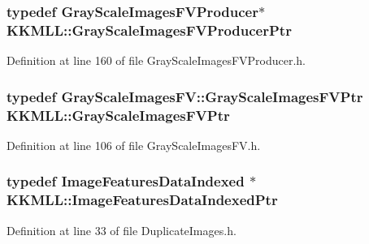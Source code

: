 \subsubsection[{\texorpdfstring{Gray\+Scale\+Images\+F\+V\+Producer\+Ptr}{GrayScaleImagesFVProducerPtr}}]{\setlength{\rightskip}{0pt plus 5cm}typedef {\bf Gray\+Scale\+Images\+F\+V\+Producer}$\ast$ {\bf K\+K\+M\+L\+L\+::\+Gray\+Scale\+Images\+F\+V\+Producer\+Ptr}}\hypertarget{namespace_k_k_m_l_l_ad2e4f0192f9a3ac0841e33685bd4d5c6}{}\label{namespace_k_k_m_l_l_ad2e4f0192f9a3ac0841e33685bd4d5c6}


Definition at line 160 of file Gray\+Scale\+Images\+F\+V\+Producer.\+h.

\subsubsection[{\texorpdfstring{Gray\+Scale\+Images\+F\+V\+Ptr}{GrayScaleImagesFVPtr}}]{\setlength{\rightskip}{0pt plus 5cm}typedef {\bf Gray\+Scale\+Images\+F\+V\+::\+Gray\+Scale\+Images\+F\+V\+Ptr} {\bf K\+K\+M\+L\+L\+::\+Gray\+Scale\+Images\+F\+V\+Ptr}}\hypertarget{namespace_k_k_m_l_l_ac3f21d259a7b1893920f27296d70bc6e}{}\label{namespace_k_k_m_l_l_ac3f21d259a7b1893920f27296d70bc6e}


Definition at line 106 of file Gray\+Scale\+Images\+F\+V.\+h.

\subsubsection[{\texorpdfstring{Image\+Features\+Data\+Indexed\+Ptr}{ImageFeaturesDataIndexedPtr}}]{\setlength{\rightskip}{0pt plus 5cm}typedef {\bf Image\+Features\+Data\+Indexed} $\ast$ {\bf K\+K\+M\+L\+L\+::\+Image\+Features\+Data\+Indexed\+Ptr}}\hypertarget{namespace_k_k_m_l_l_a1da8f4900f46fb371a5df2c25220a788}{}\label{namespace_k_k_m_l_l_a1da8f4900f46fb371a5df2c25220a788}


Definition at line 33 of file Duplicate\+Images.\+h.


